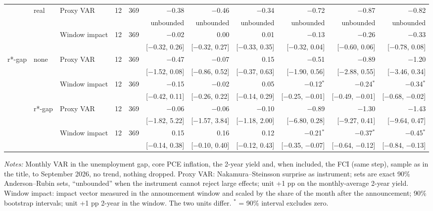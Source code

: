 \begin{table}[tp]
{\begin{tabular}{lllcrrrrrrr}
 & real & Proxy VAR & 12 & 369 & $-$0.38 & $-$0.46 & $-$0.34 & $-$0.72 & $-$0.87 & $-$0.82\\
 & & & & & {\tiny unbounded} & {\tiny unbounded} & {\tiny unbounded} & {\tiny unbounded} & {\tiny unbounded} & {\tiny unbounded}\\
 &  & Window impact & 12 & 369 & $-$0.02 & 0.00 & 0.01 & $-$0.13 & $-$0.26 & $-$0.33\\
 & & & & & {\tiny [$-$0.32, 0.26]} & {\tiny [$-$0.32, 0.27]} & {\tiny [$-$0.33, 0.35]} & {\tiny [$-$0.32, 0.04]} & {\tiny [$-$0.60, 0.06]} & {\tiny [$-$0.78, 0.08]}\\
\addlinespace
r*-gap & none & Proxy VAR & 12 & 369 & $-$0.47 & $-$0.07 & 0.15 & $-$0.51 & $-$0.89 & $-$1.20\\
 & & & & & {\tiny [$-$1.52, 0.08]} & {\tiny [$-$0.86, 0.52]} & {\tiny [$-$0.37, 0.63]} & {\tiny [$-$1.90, 0.56]} & {\tiny [$-$2.88, 0.55]} & {\tiny [$-$3.46, 0.34]}\\
 &  & Window impact & 12 & 369 & $-$0.15 & $-$0.02 & 0.05 & $-$0.12$^{*}$ & $-$0.24$^{*}$ & $-$0.34$^{*}$\\
 & & & & & {\tiny [$-$0.42, 0.11]} & {\tiny [$-$0.26, 0.22]} & {\tiny [$-$0.14, 0.29]} & {\tiny [$-$0.25, $-$0.01]} & {\tiny [$-$0.49, $-$0.01]} & {\tiny [$-$0.68, $-$0.02]}\\
 & r*-gap & Proxy VAR & 12 & 369 & $-$0.06 & $-$0.06 & $-$0.10 & $-$0.89 & $-$1.30 & $-$1.43\\
 & & & & & {\tiny [$-$1.82, 5.22]} & {\tiny [$-$1.57, 3.84]} & {\tiny [$-$1.18, 2.00]} & {\tiny [$-$6.80, 0.28]} & {\tiny [$-$9.27, 0.41]} & {\tiny [$-$9.64, 0.47]}\\
 &  & Window impact & 12 & 369 & 0.15 & 0.16 & 0.12 & $-$0.21$^{*}$ & $-$0.37$^{*}$ & $-$0.45$^{*}$\\
 & & & & & {\tiny [$-$0.14, 0.38]} & {\tiny [$-$0.10, 0.40]} & {\tiny [$-$0.12, 0.43]} & {\tiny [$-$0.35, $-$0.07]} & {\tiny [$-$0.64, $-$0.12]} & {\tiny [$-$0.84, $-$0.13]}\\
\bottomrule\end{tabular}}
\begin{flushleft}\footnotesize\textit{Notes:} Monthly VAR in the unemployment gap, core PCE inflation, the 2-year yield and, when included, the FCI (same step), sample as in the title, to September 2026, no trend, nothing dropped. Proxy VAR: Nakamura--Steinsson surprise as instrument; sets are exact 90\% Anderson--Rubin sets, ``unbounded'' when the instrument cannot reject large effects; unit +1 pp on the monthly-average 2-year yield. Window impact: impact vector measured in the announcement window and scaled by the share of the month after the announcement; 90\% bootstrap intervals; unit +1 pp 2-year in the window. The two units differ. $^{*}$ = 90\% interval excludes zero.\end{flushleft}
\end{table}
